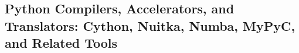 \subsection{Python Compilers, Accelerators, and Translators: Cython, Nuitka, Numba, MyPyC, and Related Tools}
